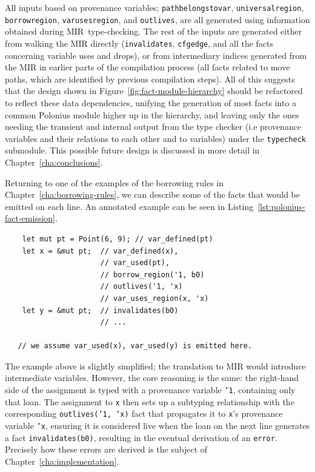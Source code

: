 \documentclass[11pt,a4paper,twoside,openany]{report}
\newenvironment{sourcecode}{\captionsetup{type=listing}}{}
\newcommand{\InRust}[1]{\texttt{#1}}
\newcommand{\InDatalog}[1]{\texttt{#1}}
\renewcommand\_{\textunderscore\allowbreak}
\begin{document}
All inputs based on provenance variables; \texttt{path\_belongs\_to\_var},
\texttt{universal\_region}, \texttt{borrow\_region}, \texttt{var\_uses\_region},
and \texttt{outlives}, are all generated using information obtained during
MIR~type-checking. The rest of the inputs are generated either from walking the
MIR directly (\texttt{invalidates}, \texttt{cfg\_edge}, and all the facts
concerning variable uses and drops), or from intermediary indices generated from
the MIR in earlier parts of the compilation process (all facts related to move
paths, which are identified by previous compilation steps). All of this suggests
that the design shown in Figure~\ref{fig:fact-module-hierarchy} should be
refactored to reflect these data dependencies, unifying the generation of most
facts into a common Polonius module higher up in the hierarchy, and leaving only
the ones needing the transient and internal output from the type checker (i.e
provenance variables and their relations to each other and to variables) under
the \texttt{type\_check} submodule. This possible future design is discussed in
more detail in Chapter~\ref{cha:conclusions}.

Returning to one of the examples of the borrowing rules in
Chapter~\ref{cha:borrowing-rules}, we can describe some of the facts that would
be emitted on each line. An annotated example can be seen in
Listing~\ref{lst:polonius-fact-emission}.

\begin{sourcecode}
  \label{lst:polonius-fact-emission}
\begin{verbatim}
    let mut pt = Point(6, 9); // var_defined(pt)
    let x = &mut pt;  // var_defined(x),
                      // var_used(pt),
                      // borrow_region('1, b0)
                      // outlives('1, 'x)
                      // var_uses_region(x, 'x)
    let y = &mut pt;  // invalidates(b0)
                      // ...

   // we assume var_used(x), var_used(y) is emitted here.
\end{verbatim}
\end{sourcecode}

The example above is slightly simplified; the translation to MIR would introduce
intermediate variables. However, the core reasoning is the same: the right-hand
side of the assignment is typed with a provenance variable \InRust{'1},
containing only that loan. The assignment to \InRust{x} then sets up a subtyping
relationship with the corresponding \InDatalog{outlives('1, 'x)} fact that
propagates it to \InRust{x}'s provenance variable \InRust{'x}, ensuring it is
considered live when the loan on the next line generates a fact
\InRust{invalidates(b0)}, resulting in the eventual derivation of an
\InRust{error}. Precisely how these errors are derived is the subject of
Chapter~\ref{cha:implementation}.
\end{document}
